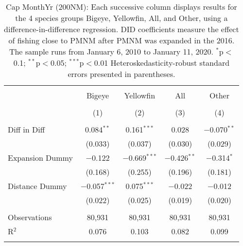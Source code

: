
\begin{table}[!htbp] \centering 
  \caption{Cap MonthYr (200NM): Each successive column displays results for the 4 species groups Bigeye, Yellowfin, All, and Other, using a difference-in-difference regression. DID coefficients measure the effect of fishing close to PMNM after PMNM was expanded in the 2016. The sample runs from January 6, 2010 to January 11, 2020. $^{*}$p$<$0.1; $^{**}$p$<$0.05; $^{***}$p$<$0.01 Heteroskedasticity-robust standard errors presented in parentheses.} 
  \label{tbl:timeFE200NM} 
\begin{tabular}{@{\extracolsep{5pt}}lcccc} 
\\[-1.8ex]\hline 
\hline \\[-1.8ex] 
 & Bigeye & Yellowfin & All & Other \\ 
\\[-1.8ex] & (1) & (2) & (3) & (4)\\ 
\hline \\[-1.8ex] 
 Diff in Diff & 0.084$^{**}$ & 0.161$^{***}$ & 0.028 & $-$0.070$^{**}$ \\ 
  & (0.033) & (0.037) & (0.030) & (0.029) \\ 
  Expansion Dummy & $-$0.122 & $-$0.669$^{***}$ & $-$0.426$^{**}$ & $-$0.314$^{*}$ \\ 
  & (0.168) & (0.255) & (0.196) & (0.181) \\ 
  Distance Dummy & $-$0.057$^{***}$ & 0.075$^{***}$ & $-$0.022 & $-$0.012 \\ 
  & (0.022) & (0.025) & (0.019) & (0.020) \\ 
 \hline \\[-1.8ex] 
Observations & 80,931 & 80,931 & 80,931 & 80,931 \\ 
R$^{2}$ & 0.076 & 0.103 & 0.082 & 0.099 \\ 
\hline 
\hline \\[-1.8ex] 
\end{tabular} 
\end{table} 
